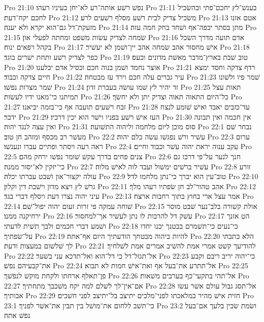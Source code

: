 Pro 21:10  נפשׁ רשׁע אותה־רע לא־יחן בעיניו רעהו׃
Pro 21:11  בענשׁ־לץ יחכם־פתי ובהשׂכיל לחכם יקח־דעת׃
Pro 21:12  משׂכיל צדיק לבית רשׁע מסלף רשׁעים לרע׃
Pro 21:13  אטם אזנו מזעקת־דל גם־הוא יקרא ולא יענה׃
Pro 21:14  מתן בסתר יכפה־אף ושׁחד בחק חמה עזה׃
Pro 21:15  שׂמחה לצדיק עשׂות משׁפט ומחתה לפעלי און׃
Pro 21:16  אדם תועה מדרך השׂכל בקהל רפאים ינוח׃
Pro 21:17  אישׁ מחסור אהב שׂמחה אהב יין־ושׁמן לא יעשׁיר׃
Pro 21:18  כפר לצדיק רשׁע ותחת ישׁרים בוגד׃
Pro 21:19  טוב שׁבת בארץ־מדבר מאשׁת מדונים וכעס׃
Pro 21:20  אוצר נחמד ושׁמן בנוה חכם וכסיל אדם יבלענו׃
Pro 21:21  רדף צדקה וחסד ימצא חיים צדקה וכבוד׃
Pro 21:22  עיר גברים עלה חכם וירד עז מבטחה׃
Pro 21:23  שׁמר פיו ולשׁונו שׁמר מצרות נפשׁו׃
Pro 21:24  זד יהיר לץ שׁמו עושׂה בעברת זדון׃
Pro 21:25  תאות עצל תמיתנו כי־מאנו ידיו לעשׂות׃
Pro 21:26  כל־היום התאוה תאוה וצדיק יתן ולא יחשׂך׃
Pro 21:27  זבח רשׁעים תועבה אף כי־בזמה יביאנו׃
Pro 21:28  עד־כזבים יאבד ואישׁ שׁומע לנצח ידבר׃
Pro 21:29  העז אישׁ רשׁע בפניו וישׁר הוא יכין דרכיו׃
Pro 21:30  אין חכמה ואין תבונה ואין עצה לנגד יהוה׃
Pro 21:31  סוס מוכן ליום מלחמה וליהוה התשׁועה׃
Pro 22:1  נבחר שׁם מעשׁר רב מכסף ומזהב חן טוב׃
Pro 22:2  עשׁיר ורשׁ נפגשׁו עשׂה כלם יהוה׃
Pro 22:3  ערום ראה רעה ויסתר ופתיים עברו ונענשׁו׃
Pro 22:4  עקב ענוה יראת יהוה עשׁר וכבוד וחיים׃
Pro 22:5  צנים פחים בדרך עקשׁ שׁומר נפשׁו ירחק מהם׃
Pro 22:6  חנך לנער על־פי דרכו גם כי־יזקין לא־יסור ממנה׃
Pro 22:7  עשׁיר ברשׁים ימשׁול ועבד לוה לאישׁ מלוה׃
Pro 22:8  זורע עולה יקצור־און ושׁבט עברתו יכלה׃
Pro 22:9  טוב־עין הוא יברך כי־נתן מלחמו לדל׃
Pro 22:10  גרשׁ לץ ויצא מדון וישׁבת דין וקלון׃
Pro 22:11  אהב טהור־לב חן שׂפתיו רעהו מלך׃
Pro 22:12  עיני יהוה נצרו דעת ויסלף דברי בגד׃
Pro 22:13  אמר עצל ארי בחוץ בתוך רחבות ארצח׃
Pro 22:14  שׁוחה עמקה פי זרות זעום יהוה יפול־שׁם׃
Pro 22:15  אולת קשׁורה בלב־נער שׁבט מוסר ירחיקנה ממנו׃
Pro 22:16  עשׁק דל להרבות לו נתן לעשׁיר אך־למחסור׃
Pro 22:17  הט אזנך ושׁמע דברי חכמים ולבך תשׁית לדעתי׃
Pro 22:18  כי־נעים כי־תשׁמרם בבטנך יכנו יחדו על־שׂפתיך׃
Pro 22:19  להיות ביהוה מבטחך הודעתיך היום אף־אתה׃
Pro 22:20  הלא כתבתי לך שׁלשׁום במעצות ודעת׃
Pro 22:21  להודיעך קשׁט אמרי אמת להשׁיב אמרים אמת לשׁלחיך׃
Pro 22:22  אל־תגזל־דל כי דל־הוא ואל־תדכא עני בשׁער׃
Pro 22:23  כי־יהוה יריב ריבם וקבע את־קבעיהם נפשׁ׃
Pro 22:24  אל־תתרע את־בעל אף ואת־אישׁ חמות לא תבוא׃
Pro 22:25  פן־תאלף ארחתו ולקחת מוקשׁ לנפשׁך׃
Pro 22:26  אל־תהי בתקעי־כף בערבים משׁאות׃
Pro 22:27  אם־אין־לך לשׁלם למה יקח משׁכבך מתחתיך׃
Pro 22:28  אל־תסג גבול עולם אשׁר עשׂו אבותיך׃
Pro 22:29  חזית אישׁ מהיר במלאכתו לפני־מלכים יתיצב בל־יתיצב לפני חשׁכים׃
Pro 23:1  כי־תשׁב ללחום את־מושׁל בין תבין את־אשׁר לפניך׃
Pro 23:2  ושׂמת שׂכין בלעך אם־בעל נפשׁ אתה׃
